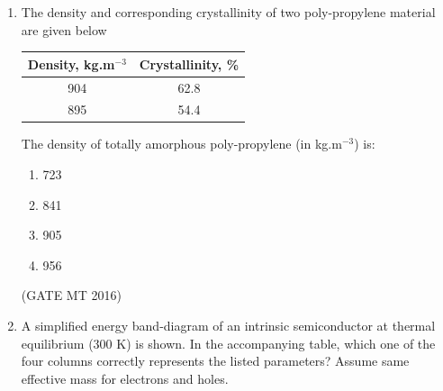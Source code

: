 \documentclass[journal, 11pt, onecolumn]{IEEEtran}
\theoremstyle{remark}
\begin{document}
\begin{enumerate}
Given data:\\  
Melting point: $1356$ K  \\
Density: $8900$ kg.m$^{-3}$  \\
Solid-liquid interfacial energy: $0.5$ Jm$^{-2}$ \\ 
Latent heat of freezing: $13000$ J.mol$^{-1}$  \\
Molar volume: $7$ $\times$10$^{-6}$ m$^{3}$mol$^{-1}$  

\begin{multicols}{4}
\begin{enumerate}
\item $0.36$  
\item $1.55$  
\item $3.65$  
\item $7.30$  
\end{enumerate}
\end{multicols}
\hfill(GATE MT 2016)

\item The density and corresponding crystallinity of two poly-propylene material are given below

\begin{center}
\begin{tabular}{|c|c|}
\hline
Density, kg.m$^{-3}$ & Crystallinity, \% \\
\hline
904 & 62.8 \\
895 & 54.4 \\
\hline
\end{tabular}
\end{center}

The density of totally amorphous poly-propylene (in kg.m$^{-3}$) is:

\begin{multicols}{4}
\begin{enumerate}
\item 723  
\item 841  
\item 905  
\item 956  
\end{enumerate}
\end{multicols}
\hfill(GATE MT 2016)

\item A simplified energy band-diagram of an intrinsic semiconductor at thermal equilibrium (300 K) is shown. In the accompanying table, which one of the four columns correctly represents the listed parameters? Assume same effective mass for electrons and holes.


\end{enumerate}
\end{document}
